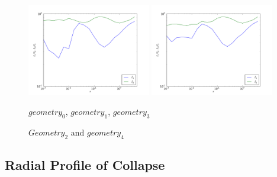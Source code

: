 \documentclass{emulateapj}
\begin{document}
\begin{figure}
\includegraphics[width=0.48\textwidth]{geometry_0.pdf}
\includegraphics[width=0.48\textwidth]{geometry_1.pdf}
\caption{$geometry_0$, $geometry_1$, $geometry_3$   
\label{fig:geometry}}
\end{figure}

\begin{figure}
\caption{$Geometry_2$ and $geometry_4$  
\label{fig:geometry 2}}
\end{figure}


 


\subsection{Radial Profile of Collapse}
\end{document}
